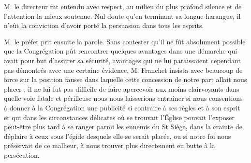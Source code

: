 M. le directeur fut entendu avec respect, au milieu du plus profond silence et de l'attention la mieux soutenue. Nul doute qu'en terminant sa longue harangue, il n'eût la conviction d'avoir porté la persuasion dans tous les esprits.

M. le préfet prit ensuite la parole. Sans contester qu'il ne fût absolument possible que la Congrégation pût rencontrer quelques avantages dans une démarche qui avait pour but d'assurer sa sécurité, avantages qui ne lui paraissaient cependant pas démontrés avec une certaine évidence, M. Franchet insista avec beaucoup de force sur la position fausse dans laquelle cette concession de notre part allait nous placer ; il ne lui fut pas difficile de faire apercevoir aux moins clairvoyants dans quelle voie fatale et périlleuse nous nous laisserions entraîner si nous consentions à donner à la Congrégation une publicité si contraire à ses règles et à son esprit et qui dans les circonstances délicates où se trouvait l'Église pouvait l'exposer
peut-être plus tard à se ranger parmi les ennemis du St Siège, dans la crainte de déplaire à ceux sous l'égide desquels elle se serait placée, ou si notre foi nous préservait de ce malheur, à nous trouver plus directement en butte à la persécution.

